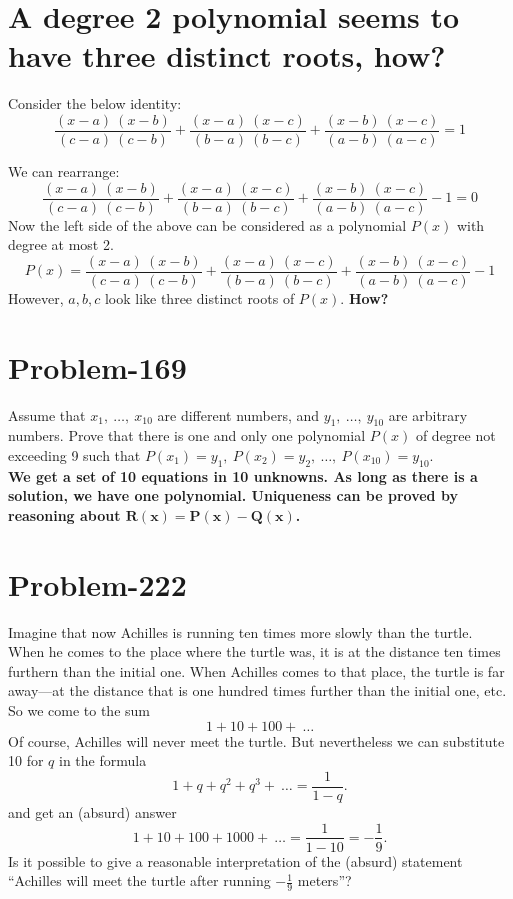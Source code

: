 \documentclass[12pt]{article}
\begin{document}
\section*{A degree 2 polynomial seems to have three distinct roots, how?}
Consider the below identity:
\[
\frac{ (x-a)\ (x-b) }{ (c-a)\ (c-b) } + \frac{ (x-a)\ (x-c) }{ (b-a)\ (b-c) } + \frac{ (x-b)\ (x-c) }{ (a-b)\ (a-c) } = 1
\]

We can rearrange:
\[
\frac{ (x-a)\ (x-b) }{ (c-a)\ (c-b) } + \frac{ (x-a)\ (x-c) }{ (b-a)\ (b-c) } + \frac{ (x-b)\ (x-c) }{ (a-b)\ (a-c) } - 1 = 0
\]
Now the left side of the above can be considered as a polynomial $P(x)$ with degree at most 2.
\[
P(x) = \frac{ (x-a)\ (x-b) }{ (c-a)\ (c-b) } + \frac{ (x-a)\ (x-c) }{ (b-a)\ (b-c) } + \frac{ (x-b)\ (x-c) }{ (a-b)\ (a-c) } - 1
\]
However, $a, b, c$ look like three distinct roots of $P(x)$. \textbf{ How?}

\section*{Problem-169}
Assume that $x_1,\ \ldots,\ x_{10}$ are different numbers, and $y_1,\ \ldots,\ y_{10}$ are arbitrary numbers. Prove that there is one and only one polynomial $P(x)$ of degree not exceeding 9 such that $P(x_1) = y_1,\ P(x_2) = y_2,\ \ldots,\ P(x_{10}) = y_{10}$.\\

\textbf{We get a set of 10 equations in 10 unknowns. As long as there is a solution, we have one polynomial. Uniqueness can be proved by reasoning about $\boldsymbol{R(x) = P(x)-Q(x)}$.}

\section*{Problem-222}
Imagine that now Achilles is running ten times more slowly than the turtle. When he comes to the place where the turtle was, it is at the distance ten times furthern than the initial one. When Achilles comes to that place, the turtle is far away---at the distance that is one hundred times further than the initial one, etc. So we come to the sum
\[
	1 + 10 + 100 +\ \ldots
\]
Of course, Achilles will never meet the turtle. But nevertheless we can substitute 10 for $q$ in the formula
\begin{equation}
	1 + q + q^2 + q^3 +\ \ldots = \frac{1}{1-q}.
\end{equation}
and get an (absurd) answer
\begin{equation}
	1 + 10 + 100 + 1000 +\ \ldots = \frac{1}{1-10} = -\frac{1}{9}.
\end{equation}
Is it possible to give a reasonable interpretation of the (absurd) statement ``Achilles will meet the turtle after running $-\frac{1}{9}$ meters''?\\
\end{document}
